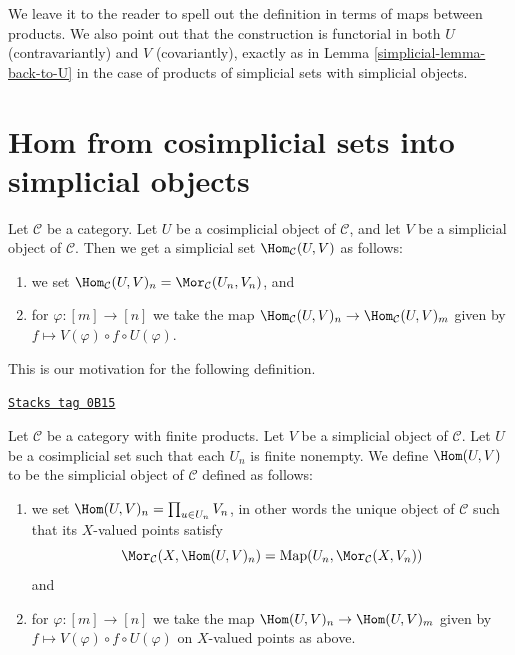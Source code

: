 We leave it to the reader to spell out the
definition in terms of maps between products.
We also point out that the construction is functorial
in both $U$ (contravariantly) and $V$ (covariantly), exactly as in
Lemma \ref{simplicial-lemma-back-to-U} in the case of
products of simplicial sets with simplicial objects.

\section{Hom from cosimplicial sets into simplicial objects}
\label{simplicial-section-hom-from-cosimplicial-sets-into-simplicial}
Let $\mathcal{C}$ be a category. Let $U$ be a cosimplicial object of
$\mathcal{C}$, and let $V$ be a simplicial object of $\mathcal{C}$.
Then we get a simplicial set $\Hom_\mathcal{C}(U, V)$ as follows:
\begin{enumerate}
\item we set
$\Hom_\mathcal{C}(U, V)_n = \Mor_\mathcal{C}(U_n, V_n)$, and
\item for $\varphi : [m] \to [n]$ we take the map
$\Hom_\mathcal{C}(U, V)_n \to \Hom_\mathcal{C}(U, V)_m$
given by $f \mapsto V(\varphi) \circ f \circ U(\varphi)$.
\end{enumerate}
This is our motivation for the following definition.

\begin{definition}
\label{simplicial-definition-hom-deltak-simplicial}
\href{https://stacks.math.columbia.edu/tag/0B15}{\texttt{Stacks tag 0B15}}

Let $\mathcal{C}$ be a category with finite products.
Let $V$ be a simplicial object of $\mathcal{C}$.
Let $U$ be a cosimplicial set such that each $U_n$ is finite nonempty.
We define {\it $\Hom(U, V)$} to be
the simplicial object of $\mathcal{C}$ defined
as follows:
\begin{enumerate}
\item we set $\Hom(U, V)_n = \prod_{u \in U_n} V_n$,
in other words the unique object of $\mathcal{C}$ such
that its $X$-valued points satisfy
$$
\Mor_\mathcal{C}(X, \Hom(U, V)_n)
=
\text{Map}(U_n, \Mor_\mathcal{C}(X, V_n))
$$
and
\item for $\varphi : [m] \to [n]$ we take the map
$\Hom(U, V)_n \to \Hom(U, V)_m$
given by $f \mapsto V(\varphi) \circ f \circ U(\varphi)$
on $X$-valued points as above.
\end{enumerate}
\end{definition}

